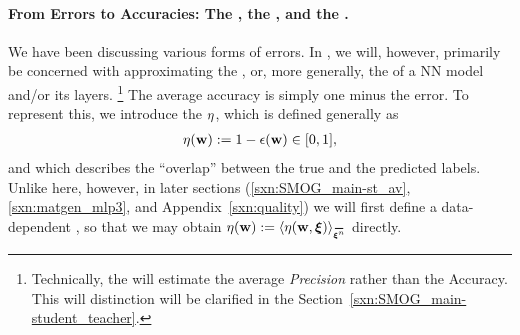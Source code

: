 \paragraph{From Errors to Accuracies: The \AverageGeneralizationAccuracy, the \Quality, and the \SelfOverlap.}
We have been discussing various forms of errors.
In \SETOL, we will, however, primarily be concerned with approximating the \emph{\AverageGeneralizationAccuracy},
or, more generally, the \Quality of a NN model and/or its layers.
\footnote{Technically, the \Quality will estimate the average \emph{Precision} rather than the Accuracy.
This will distinction will be clarified in the Section~\ref{sxn:SMOG_main-student_teacher}.}
The average accuracy is simply one minus the error.
To represent this,
we introduce the \emph{\SelfOverlap} $\eta$, which is defined generally as
\begin{align}
 \label{eqn:def_eta}
 \eta({\mathbf{w}}) := 1-\epsilon({\mathbf{w}}) \in[0,1] ,
\end{align}
and which 
describes the ``overlap'' between the true and the predicted labels.
Unlike here, however, in later sections
(\ref{sxn:SMOG_main-st_av}, \ref{sxn:matgen_mlp3}, and Appendix~\ref{sxn:quality})
we will first define a data-dependent \SelfOverlap, so that we may obtain
 $\ETA(\WVEC):=\langle\ETA(\WVEC,\XI)\rangle_{\AVGNDXIn}$ directly.


